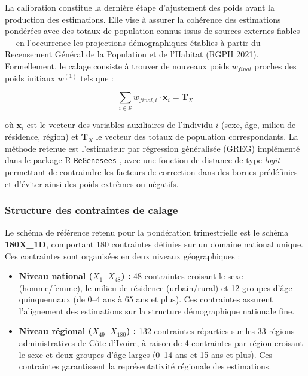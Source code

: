 \documentclass[12pt, a4paper]{article}
\begin{document}
La calibration constitue la dernière étape d'ajustement des poids avant la production des estimations. Elle vise à assurer la cohérence des estimations pondérées avec des totaux de population connus issus de sources externes fiables — en l'occurrence les projections démographiques établies à partir du Recensement Général de la Population et de l'Habitat (RGPH 2021). Formellement, le calage consiste à trouver de nouveaux poids $w_{final}$ proches des poids initiaux $w^{(1)}$ tels que :

\begin{equation}
  \sum_{i \in \mathcal{S}} w_{final,i} \cdot \mathbf{x}_i = \mathbf{T}_X
\end{equation}

où $\mathbf{x}_i$ est le vecteur des variables auxiliaires de l'individu $i$ (sexe, âge, milieu de résidence, région) et $\mathbf{T}_X$ le vecteur des totaux de population correspondants. La méthode retenue est l'estimateur par régression généralisée (GREG) implémenté dans le package R \texttt{ReGenesees} \cite{zardetto2015}, avec une fonction de distance de type \textit{logit} permettant de contraindre les facteurs de correction dans des bornes prédéfinies et d'éviter ainsi des poids extrêmes ou négatifs.

\subsubsection{Structure des contraintes de calage}

Le schéma de référence retenu pour la pondération trimestrielle est le schéma \textbf{180X\_1D}, comportant 180 contraintes définies sur un domaine national unique. Ces contraintes sont organisées en deux niveaux géographiques :

\begin{itemize}[noitemsep]
  \item \textbf{Niveau national ($X_1$--$X_{48}$) :} 48 contraintes croisant le sexe (homme/femme), le milieu de résidence (urbain/rural) et 12 groupes d'âge quinquennaux (de 0--4 ans à 65 ans et plus). Ces contraintes assurent l'alignement des estimations sur la structure démographique nationale fine.
  \item \textbf{Niveau régional ($X_{49}$--$X_{180}$) :} 132 contraintes réparties sur les 33 régions administratives de Côte d'Ivoire, à raison de 4 contraintes par région croisant le sexe et deux groupes d'âge larges (0--14 ans et 15 ans et plus). Ces contraintes garantissent la représentativité régionale des estimations.
\end{itemize}
\end{document}
